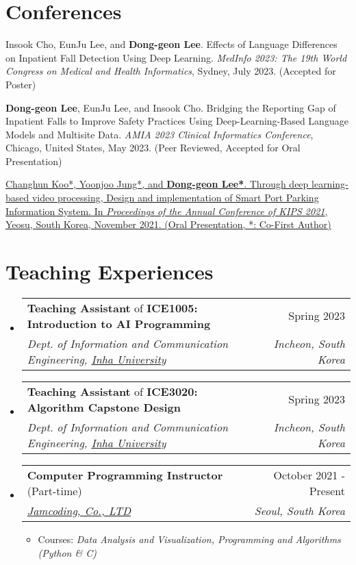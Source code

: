 \documentclass[letterpaper,11pt]{article}
\makeatletter
\newcommand{\resumeSubheading}[4]{
  \vspace{-1pt}\item
    \begin{tabular*}{0.97\textwidth}{l@{\extracolsep{\fill}}r}
      #1 & #2 \\
      \textit{\small#3} & \textit{\small #4} \\
    \end{tabular*}\vspace{-5pt}
}
\makeatother
\begin{document}
    \section{Conferences}
    \begin{enumerate}[noitemsep, leftmargin=*,label={[\arabic*]}]
        \item {Insook Cho, EunJu Lee, and \textbf{Dong-geon Lee}. Effects of Language Differences on Inpatient Fall Detection Using Deep Learning. \textit{MedInfo 2023: The 19th World Congress on Medical and Health Informatics}, Sydney, July 2023. (Accepted for Poster)}
        
        \item {\textbf{Dong-geon Lee}, EunJu Lee, and Insook Cho. Bridging the Reporting Gap of Inpatient Falls to Improve Safety Practices Using Deep-Learning-Based Language Models and Multisite Data. \textit{AMIA 2023 Clinical Informatics Conference}, Chicago, United States, May 2023. (Peer Reviewed, Accepted for Oral Presentation)}
        
        \item {\href{https://doi.org/10.3745/PKIPS.y2021m11a.1342}{Changhun Koo*, Yoonjoo Jung*, and \textbf{Dong-geon Lee*}. Through deep learning-based video processing, Design and implementation of Smart Port Parking Information System. In \textit{Proceedings of the Annual Conference of KIPS 2021}, Yeosu, South Korea, November 2021. (Oral Presentation, *: Co-First Author)}}
    \end{enumerate}
    
    \section{Teaching Experiences}
    \begin{itemize}[leftmargin=*,label=]
        \resumeSubheading
        {\textbf{Teaching Assistant} of \textbf{ICE1005: Introduction to AI Programming}}{Spring 2023}
            {Dept. of Information and Communication Engineering, \href{https://eng.inha.ac.kr/eng/index.do}{Inha University}}{Incheon, South Korea}
        \resumeSubheading
        {\textbf{Teaching Assistant} of \textbf{ICE3020: Algorithm Capstone Design}}{Spring 2023}
            {Dept. of Information and Communication Engineering, \href{https://eng.inha.ac.kr/eng/index.do}{Inha University}}{Incheon, South Korea}           
        \resumeSubheading
        {\textbf{Computer Programming Instructor} (Part-time)}{October 2021 - Present}
            {\href{https://jamcoding.co.kr/}{Jamcoding, Co., LTD}}{Seoul, South Korea}
            \begin{itemize}[label=\bullet]
                \item{Courses: \textit{Data Analysis and Visualization, Programming and Algorithms (Python \& C)}}
            \end{itemize}
    \end{itemize}
\end{document}
